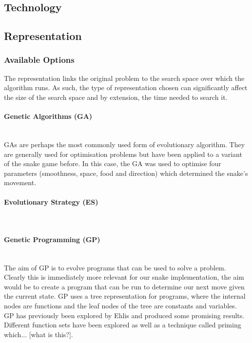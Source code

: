 \documentclass{article}
\newcommand{\myparagraph}[1]{\paragraph{#1}\mbox{}\\}
\begin{document}
\subsection{Technology}

\subsection{Representation}
\subsubsection{Available Options}
The representation links the original problem to the search space over which the algorithm runs. As such, the type of representation chosen can significantly affect the size of the search space and by extension, the time needed to search it. 


\myparagraph{Genetic Algorithms (GA)}
GAs are perhaps the most commonly used form of evolutionary algorithm. They are generally used for optimisation problems but have been applied to a variant of the snake game before\cite{snake_paper}. In this case, the GA was used to optimise four parameters (smoothness, space, food and direction) which determined the snake's movement.

\myparagraph{Evolutionary Strategy (ES)}


\myparagraph{Genetic Programming (GP)}
The aim of GP is to evolve programs that can be used to solve a problem. Clearly this is immediately more relevant for our snake implementation, the aim would be to create a program that can be run to determine our next move given the current state. GP uses a tree representation for programs, where the internal nodes are functions and the leaf nodes of the tree are constants and variables.
\\
GP has previously been explored by Ehlis\cite{snake_blog} and produced some promising results. Different function sets have been explored as well as a technique called priming which... [what is this?].
\end{document}
